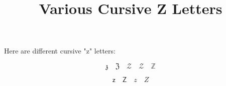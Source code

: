 \documentclass{article}
\begin{document}
\title{Various Cursive Z Letters}
\author{}
\date{}
\maketitle

Here are different cursive "z" letters:

\[
\mathfrak{z} \quad \mathfrak{Z} \quad \mathcal{Z} \quad \mathscr{Z} \quad \mathbb{Z}
\]

\[
\mathsf{z} \quad \mathsf{Z} \quad \mathit{z} \quad \mathit{Z}
\]
\end{document}
